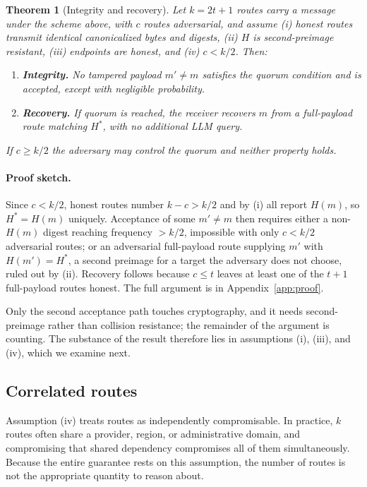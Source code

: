\documentclass{article}
\newtheorem{theorem}{Theorem}
\begin{document}
\begin{theorem}[Integrity and recovery]
\label{thm:main}
Let $k = 2t+1$ routes carry a message under the scheme above, with $c$ routes adversarial, and assume (i) honest routes transmit identical canonicalized bytes and digests, (ii) $H$ is second-preimage resistant, (iii) endpoints are honest, and (iv) $c < k/2$. Then:
\begin{enumerate}
    \item \textbf{Integrity.} No tampered payload $m' \neq m$ satisfies the quorum condition and is accepted, except with negligible probability.
    \item \textbf{Recovery.} If quorum is reached, the receiver recovers $m$ from a full-payload route matching $H^\ast$, with no additional LLM query.
\end{enumerate}
If $c \geq k/2$ the adversary may control the quorum and neither property holds.
\end{theorem}

\paragraph{Proof sketch.}
Since $c < k/2$, honest routes number $k - c > k/2$ and by (i) all report $H(m)$, so $H^\ast = H(m)$ uniquely. Acceptance of some $m' \neq m$ then requires either a non-$H(m)$ digest reaching frequency $>k/2$, impossible with only $c < k/2$ adversarial routes; or an adversarial full-payload route supplying $m'$ with $H(m') = H^\ast$, a second preimage for a target the adversary does not choose, ruled out by (ii). Recovery follows because $c \le t$ leaves at least one of the $t+1$ full-payload routes honest. The full argument is in Appendix~\ref{app:proof}.

Only the second acceptance path touches cryptography, and it needs second-preimage rather than collision resistance; the remainder of the argument is counting. The substance of the result therefore lies in assumptions (i), (iii), and (iv), which we examine next.

\subsection{Correlated routes}
\label{sec:correlated}

Assumption (iv) treats routes as independently compromisable. In practice, $k$ routes often share a provider, region, or administrative domain, and compromising that shared dependency compromises all of them simultaneously. Because the entire guarantee rests on this assumption, the number of routes is not the appropriate quantity to reason about.
\end{document}

